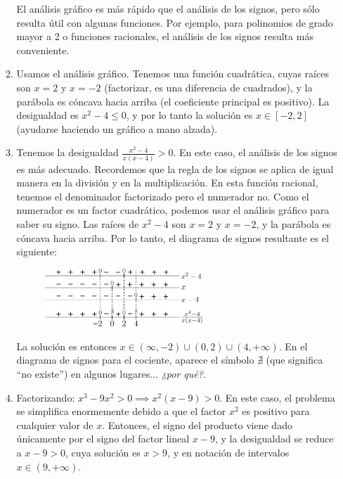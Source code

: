\documentclass[12pt]{article}
\theoremstyle{definition}
\begin{document}
\begin{enumerate}
\begin{enumerate}
El análisis gráfico es más rápido que el análisis de los signos, pero sólo resulta útil con algunas funciones. Por ejemplo, para polinomios de grado mayor a 2 o funciones racionales, el análisis de los signos resulta más conveniente.
	
\item Usamos el análisis gráfico. Tenemos una función cuadrática, cuyas raíces son $x = 2$ y $x = -2$ (factorizar, es una diferencia de cuadrados), y la parábola es cóncava hacia arriba (el coeficiente principal es positivo). La desigualdad es $x^2 - 4 \leq 0$, y por lo tanto la solución es $x \in [-2,2]$ (ayudarse haciendo un gráfico a mano alzada).
	
\item Tenemos la desigualdad $\frac{x^2 - 4 }{x(x - 4)} > 0$. En este caso, el análisis de los signos es más adecuado. Recordemos que la regla de los signos se aplica de igual manera en la división y en la multiplicación. En esta función racional, tenemos el denominador factorizado pero el numerador no. Como el numerador es un factor cuadrático, podemos usar el análisis gráfico para saber su signo. Las raíces de $x^2 -4$ son $x = 2$ y $x = -2$, y la parábola es cóncava hacia arriba. Por lo tanto, el diagrama de signos resultante es el siguiente:

\begin{figure}[H]
	\centering
	\includegraphics[width=0.6\textwidth]{16_d.png}
\end{figure}
	
La solución es entonces $x \in (\infty,-2) \cup (0,2) \cup (4,+\infty)$. En el diagrama de signos para el cociente, aparece el símbolo $\nexists$ (que significa ``no existe'') en algunos lugares... \textit{¿por qué?}.
	
\item Factorizando: ${x^3 - 9x^2 > 0 \implies x^2(x - 9) > 0}$. En este caso, el problema se simplifica enormemente debido a que el factor $x^2$ es positivo para cualquier valor de $x$. Entonces, el signo del producto viene dado únicamente por el signo del factor lineal $x - 9$, y la desigualdad se reduce a $x - 9 > 0$, cuya solución es $x > 9$, y en notación de intervalos $x \in (9,+\infty)$.
	

\end{enumerate}
\end{enumerate}
\end{document}
